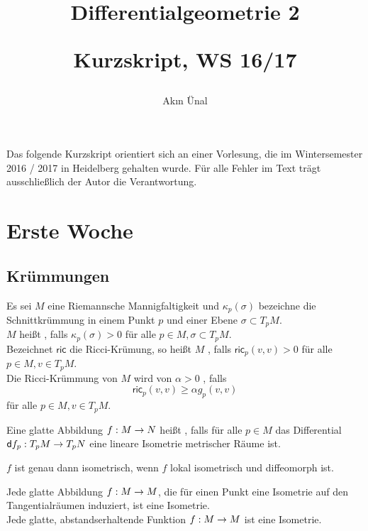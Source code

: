 \documentclass{book}
\renewcommand{\d}{\textsf{d}}
\newcommand{\ric}{\textsf{ric}}
\begin{document}
\title{
\begin{huge}
Differentialgeometrie 2\\
\end{huge}
\begin{large}
Kurzskript, WS 16/17
\end{large}}


\author{Ak\i n Ünal}
\maketitle
\renewcommand{\i}{^{-1}}

Das folgende Kurzskript orientiert sich an einer Vorlesung, die im Wintersemester 2016 / 2017 in Heidelberg gehalten wurde. Für alle Fehler im Text trägt ausschließlich der Autor die Verantwortung.

\setcounter{tocdepth}{1}
\tableofcontents


\chapter{Erste Woche}
\section{Krümmungen}

\Def{}
Es sei $M$ eine Riemannsche Mannigfaltigkeit und $\kappa_p(\sigma)$ bezeichne die Schnittkrümmung in einem Punkt $p$ und einer Ebene $\sigma \subset T_pM$.\\
$M$ heißt , falls $\kappa_p(\sigma) > 0$ für alle $p \in M, \sigma \subset T_pM$.\\
Bezeichnet $\ric$ die Ricci-Krümung, so heißt $M$ , falls $\ric_p(v,v) > 0$ für alle $p \in M, v \in T_pM$.\\
Die Ricci-Krümmung von $M$ wird von $\alpha > 0$ , falls
\[ \ric_p(v,v) \geq \alpha g_p(v,v) \]
für alle $p \in M, v \in T_pM$.

Eine glatte Abbildung $f : M \overset{}{\rightarrow} N$ heißt , falls für alle $p \in M$ das Differential $\d f_p : T_pM \pfeil{} T_pN$ eine lineare Isometrie metrischer Räume ist.

\Bem{}
$f$ ist genau dann isometrisch, wenn $f$ lokal isometrisch und diffeomorph ist.

\Satz{}
Jede glatte Abbildung $f : M \overset{}{\rightarrow} M$, die für einen Punkt eine Isometrie auf den Tangentialräumen induziert, ist eine Isometrie.\\
Jede glatte, abstandserhaltende Funktion $f : M \overset{}{\rightarrow} M$ ist eine Isometrie.
\end{document}
